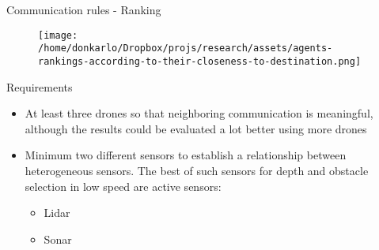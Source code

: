 \documentclass[unknownkeysallowed]{beamer}
\begin{document}
	\begin{frame}{Communication rules - Ranking}
		\begin{figure}
			\centering
			\texttt{[image: /home/donkarlo/Dropbox/projs/research/assets/agents-rankings-according-to-their-closeness-to-destination.png]}
			\label{fig:agents-rankings-according-to-their-closeness-to-destination.png}
		\end{figure}
	\end{frame}

	\begin{frame}{Requirements}
		\begin{itemize}
			\item At least three drones so that neighboring communication is meaningful, although the results could be evaluated a lot better using more drones
			\item Minimum two different sensors to establish a relationship between heterogeneous sensors. The best of such sensors for depth and obstacle selection in low speed are active sensors: 
			\begin{itemize}
				\item Lidar
				\item Sonar
			\end{itemize}
		\end{itemize}
	\end{frame}
\end{document}
